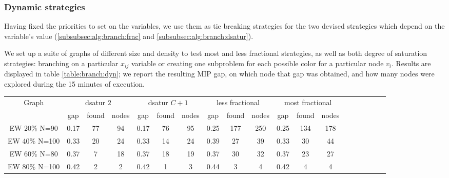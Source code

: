 \subsubsection*{Dynamic strategies}

Having fixed the priorities to set on the variables, we use them as tie breaking strategies for the two devised strategies which depend on the variable's value (\ref{subsubsec:alg:branch:frac} and \ref{subsubsec:alg:branch:dsatur}). 

We set up a suite of graphs of different size and density to test most and less fractional strategies, as well as both degree of saturation strategies: branching on a particular $x_{ij}$ variable or creating one subproblem for each possible color for a particular node $v_i$. Results are displayed in table \ref{table:branch:dyn}; we report the resulting MIP gap, on which node that gap was obtained, and how many nodes were explored during the 15 minutes of execution.

\begin{sidewaystable}
\label{table:branch:dyn}
\centering

\begin{tabular}{|c|ccc|ccc|ccc|ccc|ccc|ccc|}
\hline
\multicolumn{1}{|c|}{Graph} & \multicolumn{3}{|c|}{dsatur $2$} & \multicolumn{3}{|c|}{dsatur $C+1$} & \multicolumn{3}{|c|}{less fractional} & \multicolumn{3}{|c|}{most fractional} 
\\
 & gap & found & nodes & gap & found & nodes & gap & found & nodes & gap & found & nodes
\\
\hline
EW 20\% N=90 & 0.17 & 77 & 94 & 0.17 & 76 & 95 & 0.25 & 177 & 250 & 0.25 & 134 & 178 
\\
EW 40\% N=100 & 0.33 & 20 & 24 & 0.33 & 14 & 24 & 0.39 & 27 & 39 & 0.33 & 30 & 44 
\\
EW 60\% N=80 & 0.37 & 7 & 18 & 0.37 & 18 & 19 & 0.37 & 30 & 32 & 0.37 & 23 & 27 
\\
EW 80\% N=100 & 0.42 & 2 & 2 & 0.42 & 1 & 3 & 0.44 & 3 & 4 & 0.42 & 4 & 4
\\
\hline 
 \end{tabular}

\caption{Results for fractional and degree of saturation (spanning either $2$ or $C+1$ subproblems) branching strategies on branch and bound schemes. Data reported is MIP gap after $15$ minutes of execution, on which node (in thousands) that gap was found, and how many nodes (in thousands) were explored in total.}

\end{sidewaystable}

